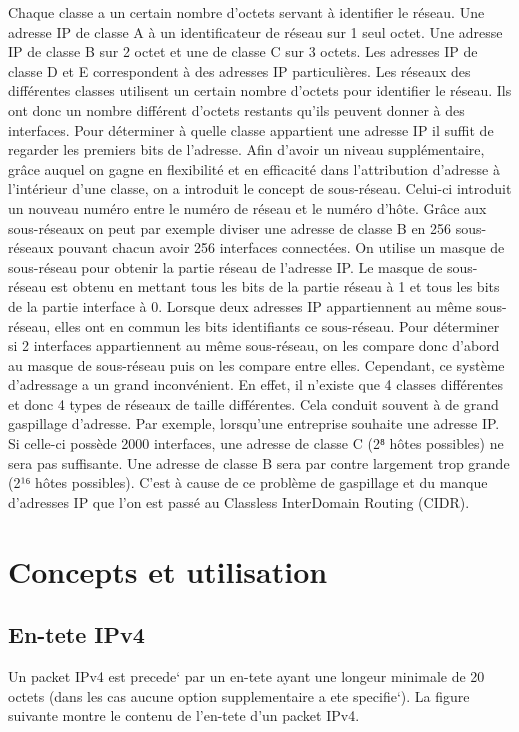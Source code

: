 \documentclass[twoside,openright,a4paper,11pt,french]{article}
\begin{document}
Chaque classe a un certain nombre d'octets servant à identifier le réseau. Une adresse IP de classe A à un identificateur de réseau sur 1 seul octet. Une adresse IP de classe B sur 2 octet et une de classe C sur 3 octets. Les adresses IP de classe D et E correspondent à des adresses IP particulières.
Les réseaux des différentes classes utilisent un certain nombre d'octets pour identifier le réseau. Ils ont donc un nombre différent d'octets restants qu'ils peuvent donner à des interfaces. 
Pour déterminer à quelle classe appartient une adresse IP il suffit de regarder les premiers bits de l'adresse.
Afin d'avoir un niveau supplémentaire, grâce auquel on gagne en flexibilité et en efficacité dans l'attribution d'adresse à l'intérieur d'une classe, on a introduit le concept de sous-réseau. Celui-ci introduit un nouveau numéro entre le numéro de réseau et le numéro d'hôte. Grâce aux sous-réseaux on peut par exemple diviser une adresse de classe B en 256 sous-réseaux pouvant chacun avoir 256 interfaces connectées.
On utilise un masque de sous-réseau pour obtenir la partie réseau de l'adresse IP. Le masque de sous-réseau est obtenu en mettant tous les bits de la partie réseau à 1 et tous les bits de la partie interface à 0. Lorsque deux adresses IP appartiennent au même sous-réseau, elles ont en commun les bits identifiants ce sous-réseau. Pour déterminer si 2 interfaces appartiennent au même sous-réseau, on les compare donc d'abord au masque de sous-réseau puis on les compare entre elles.
Cependant, ce système d'adressage a un grand inconvénient. En effet, il n'existe que 4 classes différentes et donc 4 types de réseaux de taille différentes. Cela conduit souvent à de grand gaspillage d'adresse. Par exemple, lorsqu'une entreprise souhaite une adresse IP. Si celle-ci possède 2000 interfaces, une adresse de classe C (2⁸ hôtes possibles) ne sera pas suffisante. Une adresse de classe B sera par contre largement trop grande (2¹⁶ hôtes possibles). C'est à cause de ce problème de gaspillage et du manque d'adresses IP que l'on est passé au   Classless InterDomain Routing (CIDR).



\section{Concepts et utilisation}

\subsection{En-tete IPv4}
Un packet IPv4 est precede` par un en-tete ayant une longeur minimale de 20 octets 
(dans les cas aucune option supplementaire a ete specifie`).
La figure suivante montre le contenu de l'en-tete d'un packet IPv4.
\end{document}
